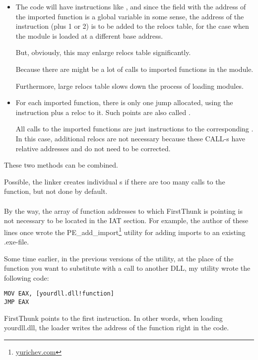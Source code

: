 \begin{itemize}
\item The code will have instructions like , 
and since the field with the address of the imported function is a global variable in some sense, 
the address of the  instruction (plus 1 or 2) is to be added to the relocs table,
for the case when the module is loaded at a different base address.

But, obviously, this may enlarge relocs table significantly.

Because there are might be a lot of calls to imported functions in the module.

Furthermore, large relocs table slows down the process of loading modules.

\item For each imported function, there is only one jump allocated, using the \JMP instruction 
plus a reloc to it.
Such points are also called .

All calls to the imported functions are just \CALL instructions to the corresponding .
In this case, additional relocs are not necessary because these CALL-s
have relative addresses and do not need to be corrected.
\end{itemize}

These two methods can be combined.

Possible, the linker creates individual s if there are too many calls to the function,
but not done by default. \\
\\
By the way, the array of function addresses to which FirstThunk is pointing is not necessary to be located in the \ac{IAT} section.
For example, the author of these lines once wrote the PE\_add\_import\footnote{\href{http://go.yurichev.com/17049}{yurichev.com}} 
utility for adding imports to an existing .exe-file.

Some time earlier, in the previous versions of the utility, 
at the place of the function you want to substitute with a call to another DLL,
my utility wrote the following code:

\begin{lstlisting}
MOV EAX, [yourdll.dll!function]
JMP EAX
\end{lstlisting}

FirstThunk points to the first instruction. In other words, when loading yourdll.dll,
the loader writes the address of the  function right in the code.

